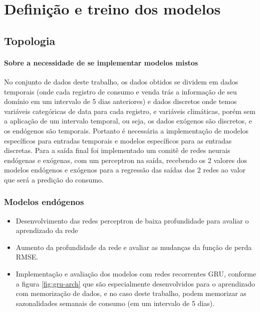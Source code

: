 \documentclass[	12pt, Times, openright, twoside, a4paper, english, brazil]{abntex2}
\begin{document}
    \section{Definição e treino dos modelos}
        \subsection{Topologia}
            \paragraph*{Sobre a necessidade de se implementar modelos mistos}
                No conjunto de dados deste trabalho, os dados obtidos se dividem em dados temporais (onde cada registro de consumo e venda trás a informação de seu domínio em um intervalo de 5 dias anteriores) e dados discretos onde temos variáveis categóricas de data para cada registro, e variáveis climáticas, porém sem a aplicação de um intervalo temporal, ou seja, os dados exógenos são discretos, e os endógenos são temporais.
                Portanto é necessária a implementação de modelos específicos para entradas temporais e modelos específicos para as entradas discretas.
                Para a saída final foi implementado um comitê de redes neurais endógenas e exógenas, com um perceptron na saída, recebendo os 2 valores dos modelos endógenos e exógenos para a regressão das saídas das 2 redes ao valor que será a predição do consumo.
         	\subsubsection{Modelos endógenos}
         	\begin{itemize}
                \item	Desenvolvimento das redes perceptron de baixa profundidade para avaliar o aprendizado da rede
                \item	Aumento da profundidade da rede e avaliar as mudanças da função de perda RMSE. 
                \item	Implementação e avaliação dos modelos com redes recorrentes GRU, conforme a figura \ref{fig:gru-arch} que são especialmente desenvolvidos para o aprendizado com memorização de dados, e no caso deste trabalho, podem memorizar as sazonalidades semanais de consumo (em um intervalo de 5 dias).
            \end{itemize}
\end{document}
